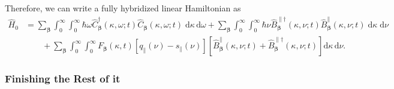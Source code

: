\documentclass{article}
\begin{document}
Therefore, we can write a fully hybridized linear Hamiltonian as
\begin{equation}
\begin{split}
\hat{H}_0 &= \sum_{\bm{\beta}}\int_0^\infty\int_0^\infty\hbar\omega\hat{C}_{\bm{\beta}}^\dagger(\kappa,\omega;t)\hat{C}_{\bm{\beta}}(\kappa,\omega;t)\;\mathrm{d}\kappa\,\mathrm{d}\omega + \sum_{\bm{\beta}}\int_0^\infty\int_0^\infty\hbar\nu\hat{B}_{\bm{\beta}}^{\parallel\dagger}(\kappa,\nu;t)\hat{B}_{\bm{\beta}}^\parallel(\kappa,\nu;t)\;\mathrm{d}\kappa\;\mathrm{d}\nu\\
&\qquad + \sum_{\bm{\beta}}\int_0^\infty\int_0^\infty F_{\bm{\beta}}(\kappa,t)\left[q_\parallel(\nu) - s_\parallel(\nu)\right]\left[\hat{B}_{\bm{\beta}}^\parallel(\kappa,\nu;t) + \hat{B}_{\bm{\beta}}^{\parallel\dagger}(\kappa,\nu;t)\right]\mathrm{d}\kappa\,\mathrm{d}\nu.
\end{split}
\end{equation}













\subsubsection{Finishing the Rest of it}
\end{document}
